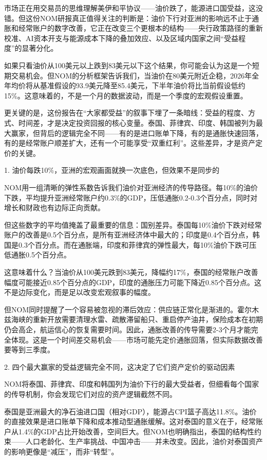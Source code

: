 \documentclass[11pt]{ctexart}
\begin{document}
市场正在用交易员的思维理解美伊和平协议——油价跌了，能源进口国受益，这没错。但这份NOM研报真正值得关注的判断是：油价下行对亚洲的影响远不止于通胀和经常账户的数字改善，它正在改变三个更根本的结构——央行政策路径的重新校准、AI资本开支与能源成本下降的叠加效应、以及区域内国家之间“受益程度”的显著分化。

如果只看油价从100美元以上跌到83美元以下这个结果，你可能会认为这是一个短期交易机会。但NOM的分析框架告诉我们，当油价在80美元附近企稳，2026年全年均价将从基准假设的93.9美元降至85.4美元，下半年油价将比当前假设低约15\%。这意味着的，不是一个月的数据波动，而是一个季度的宏观假设重置。

更关键的是，这份报告在“大家都受益”的叙事下埋了一条暗线：受益的程度、方式、时间差，才是决定投资回报的核心变量。泰国、菲律宾、印度、韩国被列为最大赢家，但背后的逻辑完全不同——有的是进口账单下降，有的是通胀快速回落，有的是经常账户顺差扩大，还有一个可能享受“双重红利”。这些差异，才是资产定价的关键。

1. 油价每跌10\%，亚洲的宏观画面就换一次底色，但效果不是同步的

NOM用一组清晰的弹性系数告诉我们油价对亚洲经济的传导路径。每10\%的油价下跌，平均提升亚洲经常账户约0.3\%的GDP，压低通胀0.2-0.3个百分点，同时对增长和财政也有边际正向贡献。

但这些数字的平均值掩盖了最重要的信息：国别差异。泰国每10\%油价下跌对经常账户的改善是0.5个百分点，是所有亚洲经济体中最大的；印度是0.4个百分点，韩国是0.3个百分点。而在通胀端，印度和菲律宾的弹性最大，每10\%油价下跌可压低通胀0.5个百分点。

这意味着什么？当油价从100美元跌到83美元，降幅约17\%，泰国的经常账户改善幅度可能接近0.85个百分点的GDP，印度的通胀压力可能下降近0.85个百分点。这不是边际变化，而是足以改变宏观叙事的幅度。

但NOM同时提醒了一个容易被忽视的滞后效应：供应链正常化是渐进的。霍尔木兹海峡的重新开放需要清理水雷、疏散滞留船只、重启停产油井，保险成本在初期仍会高企，航运信心的恢复需要时间。因此，通胀改善的传导需要2-3个月才能完全体现。这是一个时间差交易机会——市场可能先定价通胀回落，但实际数据改善要等到三季度。

2. 四个最大赢家的受益逻辑完全不同，这决定了它们资产定价的驱动因素

NOM将泰国、菲律宾、印度和韩国列为油价下行的最大受益者，但细看每个国家的传导机制，你会发现它们对应的资产逻辑截然不同。

泰国是亚洲最大的净石油进口国（相对GDP），能源占CPI篮子高达11.8\%。油价的直接效果是进口账单下降和成本推动型通胀缓解。这对泰国的意义在于，经常账户从1.4\%的GDP占比开始改善，空间巨大。但NOM也明确指出，泰国的结构性约束——人口老龄化、生产率挑战、中国冲击——并未改变。因此，油价对泰国资产的影响更像是“减压”，而非“转型”。
\end{document}
